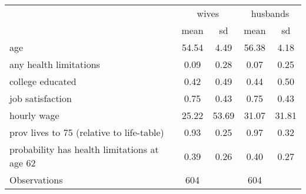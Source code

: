 {
\def\sym#1{\ifmmode^{#1}\else\(^{#1}\)\fi}
\begin{tabular}{l*{2}{cc}}
\hline\hline
                    &\multicolumn{2}{c}{wives}&\multicolumn{2}{c}{husbands}\\
                    &        mean&          sd&        mean&          sd\\
\hline
age                 &       54.54&        4.49&       56.38&        4.18\\
any health limitations&        0.09&        0.28&        0.07&        0.25\\
college educated    &        0.42&        0.49&        0.44&        0.50\\
job satisfaction    &        0.75&        0.43&        0.75&        0.43\\
hourly wage         &       25.22&       53.69&       31.07&       31.81\\
prov lives to 75 (relative to life-table)&        0.93&        0.25&        0.97&        0.32\\
probability has health limitations at age 62&        0.39&        0.26&        0.40&        0.27\\
\hline
Observations        &         604&            &         604&            \\
\hline\hline
\end{tabular}
}
